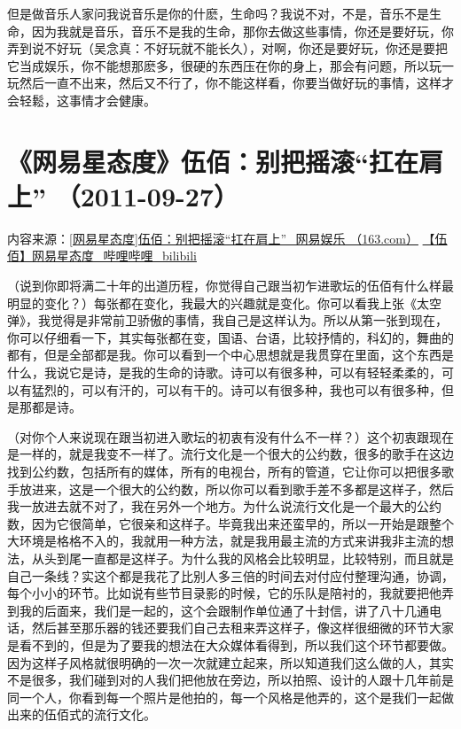 \documentclass[UTF8,a4paper,oneside,twocolumn,12pt]{ctexbook}
\begin{document}
但是做音乐人家问我说音乐是你的什麽，生命吗？我说不对，不是，音乐不是生命，因为我就是音乐，音乐不是我的生命，那你去做这些事情，你还是要好玩，你弄到说不好玩（吴念真：不好玩就不能长久），对啊，你还是要好玩，你还是要把它当成娱乐，你不能想那麽多，很硬的东西压在你的身上，那会有问题，所以玩一玩然后一直不出来，然后又不行了，你不能这样看，你要当做好玩的事情，这样才会轻鬆，这事情才会健康。

\section{《网易星态度》伍佰：别把摇滚“扛在肩上” （2011-09-27）}
内容来源：\href{https://www.163.com/ent/article/7F07EFOK00034NKD.html}{[网易星态度]伍佰：别把摇滚“扛在肩上”\_网易娱乐 （163.com）}
\href{https://www.bilibili.com/video/BV1C7411E7vm}{【伍佰】网易星态度\_哔哩哔哩\_bilibili}

（说到你即将满二十年的出道历程，你觉得自己跟当初乍进歌坛的伍佰有什么样最明显的变化？）每张都在变化，我最大的兴趣就是变化。你可以看我上张《太空弹》，我觉得是非常前卫骄傲的事情，我自己是这样认为。所以从第一张到现在，你可以仔细看一下，其实每张都在变，国语、台语，比较抒情的，科幻的，舞曲的都有，但是全部都是我。你可以看到一个中心思想就是我贯穿在里面，这个东西是什么，我说它是诗，是我的生命的诗歌。诗可以有很多种，可以有轻轻柔柔的，可以有猛烈的，可以有汗的，可以有干的。诗可以有很多种，我也可以有很多种，但是那都是诗。

（对你个人来说现在跟当初进入歌坛的初衷有没有什么不一样？）这个初衷跟现在是一样的，就是我变不一样了。流行文化是一个很大的公约数，很多的歌手在这边找到公约数，包括所有的媒体，所有的电视台，所有的管道，它让你可以把很多歌手放进来，这是一个很大的公约数，所以你可以看到歌手差不多都是这样子，然后我一放进去就不对了，我在另外一个地方。为什么说流行文化是一个最大的公约数，因为它很简单，它很亲和这样子。毕竟我出来还蛮早的，所以一开始是跟整个大环境是格格不入的，我就用一种方法，就是我用最主流的方式来讲我非主流的想法，从头到尾一直都是这样子。为什么我的风格会比较明显，比较特别，而且就是自己一条线？实这个都是我花了比别人多三倍的时间去对付应付整理沟通，协调，每个小小的环节。比如说有些节目录影的时候，它的乐队是陪衬的，我就要把他弄到我的后面来，我们是一起的，这个会跟制作单位通了十封信，讲了八十几通电话，然后甚至那乐器的钱还要我们自己去租来弄这样子，像这样很细微的环节大家是看不到的，但是为了要我的想法在大众媒体看得到，所以我们这个环节都要做。因为这样子风格就很明确的一次一次就建立起来，所以知道我们这么做的人，其实不是很多，我们碰到对的人我们把他放在旁边，所以拍照、设计的人跟十几年前是同一个人，你看到每一个照片是他拍的，每一个风格是他弄的，这个是我们一起做出来的伍佰式的流行文化。
\end{document}
